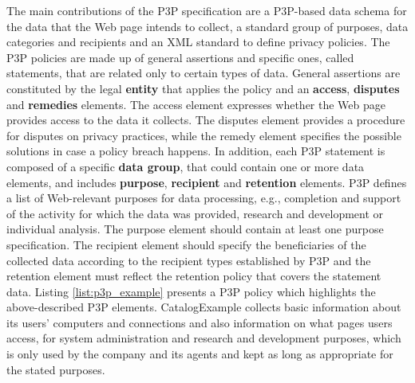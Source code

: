 The main contributions of the P3P specification are a P3P-based data schema for the data that the Web page intends to collect, a standard group of purposes, data categories and recipients and an XML standard to define privacy policies.
The P3P policies are made up of general assertions and specific ones, called statements, that are related only to certain types of data.
General assertions are constituted by the legal \textbf{entity} that applies the policy and an \textbf{access}, \textbf{disputes} and \textbf{remedies} elements.
The access element expresses whether the Web page provides access to the data it collects.
The disputes element provides a procedure for disputes on privacy practices, while the remedy element specifies the possible solutions in case a policy breach happens.
In addition, each P3P statement is composed of a specific \textbf{data group}, that could contain one or more data elements, and includes \textbf{purpose}, \textbf{recipient} and \textbf{retention} elements.
P3P defines a list of Web-relevant purposes for data processing, e.g., completion and support of the activity for which the data was provided, research and development or individual analysis.
The purpose element should contain at least one purpose specification.
The recipient element should specify the beneficiaries of the collected data according to the recipient types established by P3P and the retention element must reflect the retention policy that covers the statement data.
Listing \ref{list:p3p_example} presents a P3P policy which highlights the above-described P3P elements. CatalogExample collects basic information about its users' computers and connections and also information on what pages users access, for system administration and research and development purposes, which is only used by the company and its agents and kept as long as appropriate for the stated purposes.


